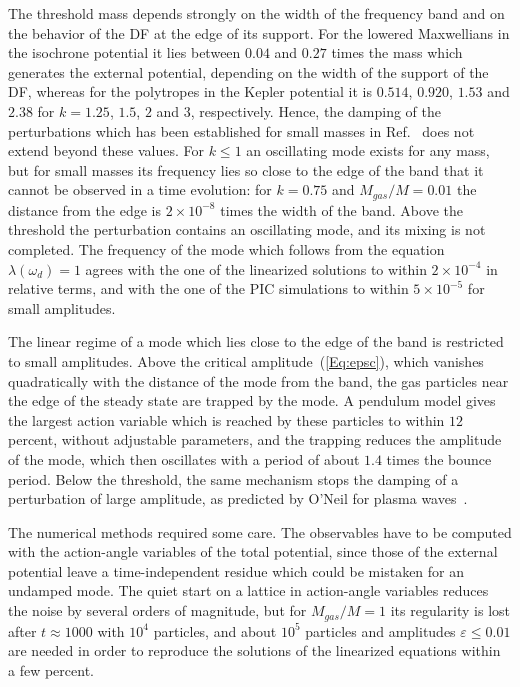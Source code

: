 The threshold mass depends strongly on the width of the frequency band and on the behavior of the DF at the edge of its support. For the lowered Maxwellians in the isochrone potential it lies between $0.04$ and $0.27$ times the mass which generates the external potential, depending on the width of the support of the DF, whereas for the polytropes in the Kepler potential it is $0.514$, $0.920$, $1.53$ and $2.38$ for $k = 1.25$, $1.5$, $2$ and $3$, respectively. Hence, the damping of the perturbations which has been established for small masses in Ref.~\cite{mHgRmScS25} does not extend beyond these values. For $k\leq 1$ an oscillating mode exists for any mass, but for small masses its frequency lies so close to the edge of the band that it cannot be observed in a time evolution: for $k = 0.75$ and $M_{gas}/M = 0.01$ the distance from the edge is $2\times 10^{-8}$ times the width of the band. Above the threshold the perturbation contains an oscillating mode, and its mixing is not completed. The frequency of the mode which follows from the equation $\lambda(\omega_d) = 1$ agrees with the one of the linearized solutions to within $2\times 10^{-4}$ in relative terms, and with the one of the PIC simulations to within $5\times 10^{-5}$ for small amplitudes.

The linear regime of a mode which lies close to the edge of the band is restricted to small amplitudes. Above the critical amplitude~(\ref{Eq:epsc}), which vanishes quadratically with the distance of the mode from the band, the gas particles near the edge of the steady state are trapped by the mode. A pendulum model gives the largest action variable which is reached by these particles to within $12$ percent, without adjustable parameters, and the trapping reduces the amplitude of the mode, which then oscillates with a period of about $1.4$ times the bounce period. Below the threshold, the same mechanism stops the damping of a perturbation of large amplitude, as predicted by O'Neil for plasma waves~\cite{tO65}.

The numerical methods required some care. The observables have to be computed with the action-angle variables of the total potential, since those of the external potential leave a time-independent residue which could be mistaken for an undamped mode. The quiet start on a lattice in action-angle variables reduces the noise by several orders of magnitude, but for $M_{gas}/M = 1$ its regularity is lost after $t\approx 1000$ with $10^4$ particles, and about $10^5$ particles and amplitudes $\varepsilon\leq 0.01$ are needed in order to reproduce the solutions of the linearized equations within a few percent.

